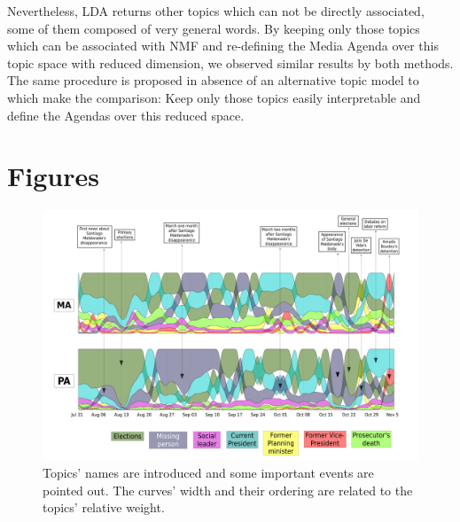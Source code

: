 \documentclass{bmcart}
\begin{document}
\begin{backmatter}
\par Nevertheless, LDA returns other topics which can not be directly associated, some of them composed of very general words. 
By keeping only those topics which can be associated with NMF and re-defining the Media Agenda over this topic space with reduced dimension, we observed similar results by both methods.  
The same procedure is proposed in absence of an alternative topic model to which make the comparison: Keep only those topics easily interpretable and define the Agendas over this reduced space.
 



\section*{Figures}

\begin{figure}[h!]
\includegraphics[width = \textwidth]{images/Fig1.pdf}
\caption{ Topics’ names are introduced and some important events are pointed out. The curves’ width and their ordering are related to the topics’ relative weight.}
\label{fig:all_agenda}
\end{figure}


\end{backmatter}
\end{document}

